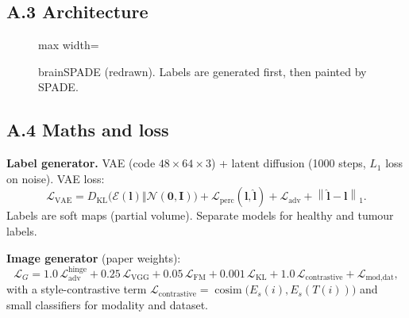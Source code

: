 \documentclass[11pt,a4paper,oneside]{report}
\newcommand{\N}{\mathcal{N}}
\newcommand{\Loss}{\mathcal{L}}
\newcommand{\enc}{\mathcal{E}}
\newcommand{\I}{\bm{I}}
\newcommand{\norm}[1]{\left\lVert #1 \right\rVert}
\begin{document}
\subsection*{A.3 Architecture}
\begin{figure}[H]
\centering
\begin{adjustbox}{max width=\linewidth}
\end{adjustbox}
\caption{brainSPADE (redrawn). Labels are generated first, then painted by SPADE.}
\end{figure}


\subsection*{A.4 Maths and loss}
\textbf{Label generator.} VAE (code $48\times64\times3$) + latent diffusion (1000 steps, $L_1$ loss on noise). VAE loss:
\begin{equation}
\Loss_{\text{VAE}}=D_{\text{KL}}\big(\enc(\bm l)\Vert\N(\bm 0,\I)\big)+\Loss_{\text{perc}}(\bm l,\hat{\bm l})+\Loss_{\text{adv}}+\norm{\hat{\bm l}-\bm l}_1 .
\end{equation}
Labels are soft maps (partial volume). Separate models for healthy and tumour labels.

\textbf{Image generator} (paper weights):
\begin{equation}
\Loss_G=1.0\,\Loss_{\text{adv}}^{\text{hinge}}+0.25\,\Loss_{\text{VGG}}+0.05\,\Loss_{\text{FM}}+0.001\,\Loss_{\text{KL}}+1.0\,\Loss_{\text{contrastive}}+\Loss_{\text{mod,dat}} ,
\end{equation}
with a style-contrastive term $\Loss_{\text{contrastive}}=\operatorname{cosim}\big(E_s(i),E_s(T(i))\big)$ and small classifiers for modality and dataset.
\end{document}

